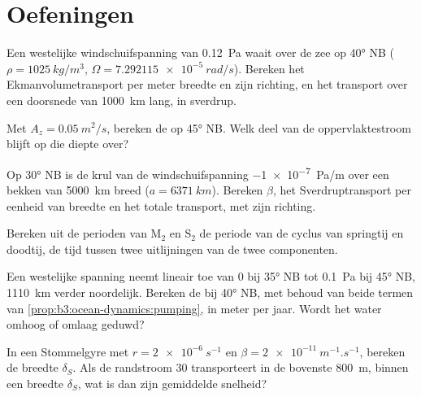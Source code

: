 \section{Oefeningen}

\begin{exercise}[$\star$]\label{exo:b3:ocean-dynamics:1}
Een westelijke windschuifspanning van \qty{0.12}{Pa} waait over de zee op \ang{40} NB
($\rho = \qty{1025}{kg/m^3}$, $\Omega = \qty{7.292115e-5}{rad/s}$).
Bereken het Ekmanvolumetransport per meter breedte en zijn richting,
en het transport over een doorsnede van \qty{1000}{km} lang, in sverdrup.
\end{exercise}

\begin{exercise}[$\star$]\label{exo:b3:ocean-dynamics:2}
Met $A_z = \qty{0.05}{m^2/s}$, bereken de  op \ang{45} NB. Welk
deel van de oppervlaktestroom blijft op die diepte over?
\end{exercise}

\begin{exercise}[$\star$]\label{exo:b3:ocean-dynamics:3}
Op \ang{30} NB is de krul van de windschuifspanning \qty{-1e-7}{Pa/m} over een
bekken van \qty{5000}{km} breed ($a = \qty{6371}{km}$). Bereken $\beta$, het
Sverdruptransport per eenheid van breedte en het totale transport, met zijn
richting.
\end{exercise}

\begin{exercise}[$\star$]\label{exo:b3:ocean-dynamics:4}
Bereken uit de perioden van M$_2$ en S$_2$ de periode van de cyclus van
springtij en doodtij, de tijd tussen twee uitlijningen van de twee
componenten.
\end{exercise}

\begin{exercise}[$\star\star$]\label{exo:b3:ocean-dynamics:5}
Een westelijke spanning neemt lineair toe van 0 bij \ang{35} NB tot \qty{0.1}{Pa} bij
\ang{45} NB, \qty{1110}{km} verder noordelijk. Bereken de  bij
\ang{40} NB, met behoud van beide termen van \cref{prop:b3:ocean-dynamics:pumping},
in meter per jaar. Wordt het water omhoog of omlaag geduwd?
\end{exercise}

\begin{exercise}[$\star\star$]\label{exo:b3:ocean-dynamics:6}
In een Stommelgyre met $r = \qty{2e-6}{s^{-1}}$ en $\beta =
\qty{2e-11}{m^{-1}.s^{-1}}$, bereken de breedte $\delta_S$. Als de randstroom
\qty{30}{\sverdrup} transporteert in de bovenste \qty{800}{m}, binnen een
breedte $\delta_S$, wat is dan zijn gemiddelde snelheid?
\end{exercise}

